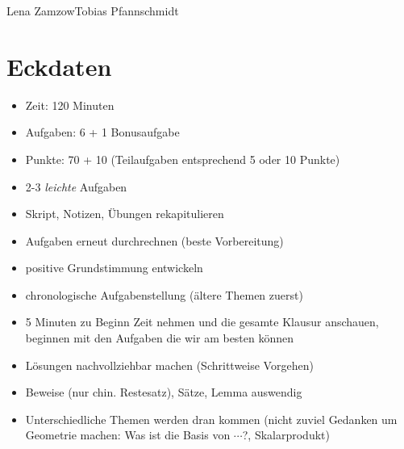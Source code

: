\documentclass[11pt,a4paper]{article}
\begin{document}
                {Lena Zamzow}{Tobias Pfannschmidt}{}{}{}


\section*{Eckdaten}
\begin{itemize}
\subsection*{Umfang}
	\item Zeit: 120 Minuten
	\item Aufgaben: 6 + 1 Bonusaufgabe
	\item Punkte: 70 + 10 (Teilaufgaben entsprechend 5 oder 10 Punkte)
	\item 2-3 \emph{leichte} Aufgaben	
\end{itemize}
\begin{itemize}
\subsection*{Vorbereitung}
	\item Skript, Notizen, Übungen rekapitulieren
	\item Aufgaben erneut durchrechnen (beste Vorbereitung)
	\item positive Grundstimmung entwickeln
\end{itemize}
\begin{itemize}
	\subsection*{Tipps}
	\item chronologische Aufgabenstellung (ältere Themen zuerst) 
	\item 5 Minuten zu Beginn Zeit nehmen und die gesamte Klausur anschauen, beginnen mit den Aufgaben die wir am besten können
	\item Lösungen nachvollziehbar machen (Schrittweise Vorgehen)
	\item Beweise (nur chin. Restesatz), Sätze, Lemma auswendig
	\item Unterschiedliche Themen werden dran kommen (nicht zuviel Gedanken um Geometrie machen: Was ist die Basis von $\cdots$?, Skalarprodukt)
\end{itemize}

\newpage
\end{document}
